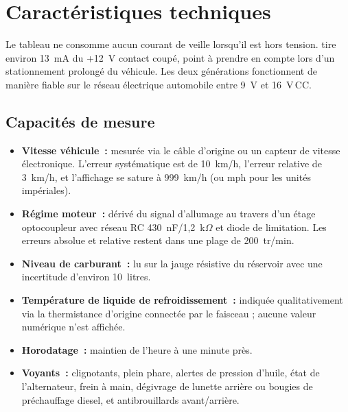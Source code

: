\chapter{Caractéristiques techniques}\label{ch:technical-specs}

Le tableau \ReplicaGenOne{} ne consomme aucun courant de veille lorsqu'il est hors tension.
\ReplicaNextShort{} tire environ 13~mA du +12~V contact coupé, point à prendre en compte lors d'un stationnement prolongé du véhicule.
Les deux générations fonctionnent de manière fiable sur le réseau électrique automobile entre 9~V et 16~V\,CC.

\section{Capacités de mesure}
\begin{itemize}
    \item \textbf{Vitesse véhicule~:} mesurée via le câble d'origine ou un capteur de vitesse électronique. L'erreur systématique est de 10~km/h, l'erreur relative de 3~km/h, et l'affichage se sature à 999~km/h (ou mph pour les unités impériales).
    \item \textbf{Régime moteur~:} dérivé du signal d'allumage au travers d'un étage optocoupleur avec réseau RC 430~nF/1,2~k\ensuremath{\Omega} et diode de limitation. Les erreurs absolue et relative restent dans une plage de 200~tr/min.
    \item \textbf{Niveau de carburant~:} lu sur la jauge résistive du réservoir avec une incertitude d'environ 10~litres.
    \item \textbf{Température de liquide de refroidissement~:} indiquée qualitativement via la thermistance d'origine connectée par le faisceau ; aucune valeur numérique n'est affichée.
    \item \textbf{Horodatage~:} maintien de l'heure à une minute près.
    \item \textbf{Voyants~:} clignotants, plein phare, alertes de pression d'huile, état de l'alternateur, frein à main, dégivrage de lunette arrière ou bougies de préchauffage diesel, et antibrouillards avant/arrière.
\end{itemize}
